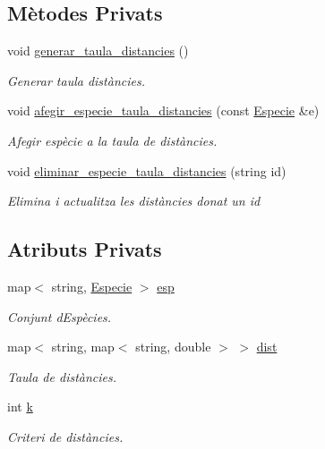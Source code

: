 \subsection*{Mètodes Privats}
\begin{DoxyCompactItemize}
\item 
void \hyperlink{class_cjt___especies_a9437508ef6176d867e0bb7fbf4ba3106}{generar\+\_\+taula\+\_\+distancies} ()
\begin{DoxyCompactList}\small\item\em Generar taula distàncies. \end{DoxyCompactList}\item 
void \hyperlink{class_cjt___especies_aed10769d0831e7b92fb0a602bce7766a}{afegir\+\_\+especie\+\_\+taula\+\_\+distancies} (const \hyperlink{class_especie}{Especie} \&e)
\begin{DoxyCompactList}\small\item\em Afegir espècie a la taula de distàncies. \end{DoxyCompactList}\item 
void \hyperlink{class_cjt___especies_aa30fcd79ec745178533800095f0e9e22}{eliminar\+\_\+especie\+\_\+taula\+\_\+distancies} (string id)
\begin{DoxyCompactList}\small\item\em Elimina i actualitza les distàncies donat un {\itshape id} \end{DoxyCompactList}\end{DoxyCompactItemize}
\subsection*{Atributs Privats}
\begin{DoxyCompactItemize}
\item 
map$<$ string, \hyperlink{class_especie}{Especie} $>$ \hyperlink{class_cjt___especies_aa232ab8543b78ea6d8ecaa1e5f9ccef5}{esp}
\begin{DoxyCompactList}\small\item\em Conjunt d\textquotesingle{}Espècies. \end{DoxyCompactList}\item 
map$<$ string, map$<$ string, double $>$ $>$ \hyperlink{class_cjt___especies_aaf5d15b706e8b0c5b910283d60ef58a6}{dist}
\begin{DoxyCompactList}\small\item\em Taula de distàncies. \end{DoxyCompactList}\item 
int \hyperlink{class_cjt___especies_a4586fb4724b7af4b7f00bb0c0bdd6a17}{k}
\begin{DoxyCompactList}\small\item\em Criteri de distàncies. \end{DoxyCompactList}\end{DoxyCompactItemize}


